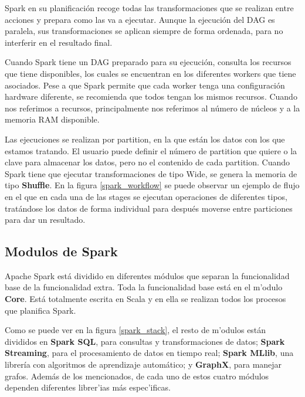 Spark en su planificación recoge todas las transformaciones que se realizan entre acciones y prepara como las va a ejecutar. Aunque la ejecución del DAG es paralela, sus transformaciones se aplican siempre de forma ordenada, para no interferir en el resultado final. 


Cuando Spark tiene un DAG preparado para su ejecución, consulta los recursos que tiene disponibles, los cuales se encuentran en los diferentes workers que tiene asociados. Pese a que Spark permite que cada worker tenga una configuración hardware diferente, se recomienda que todos tengan los mismos recursos. Cuando nos referimos a recursos, principalmente nos referimos al número de núcleos y a la memoria RAM disponible.


Las ejecuciones se realizan por partition, en la que están los datos con los que estamos tratando. El usuario puede definir el número de partition que quiere o la clave para almacenar los datos, pero no el contenido de cada partition. Cuando Spark tiene que ejecutar transformaciones de tipo Wide, se genera la memoria de tipo \textbf{Shuffle}. En la figura \ref{spark_workflow} se puede observar un ejemplo de flujo en el que en cada una de las stages se ejecutan operaciones de diferentes tipos, tratándose los datos de forma individual para después moverse entre particiones para dar un resultado.
















\clearpage
\subsection{Modulos de Spark}

Apache Spark está dividido en diferentes módulos que separan la funcionalidad base de la funcionalidad extra.
Toda la funcionalidad base está en el m'odulo \textbf{Core}. Está totalmente escrita en Scala y en ella se realizan todos los procesos que planifica Spark.



Como se puede ver en la figura \ref{spark_stack}, el resto de m'odulos están divididos en \textbf{Spark SQL}, para consultas y transformaciones de datos; \textbf{Spark Streaming}, para el procesamiento de datos en tiempo real; \textbf{Spark MLlib}, una librería con algoritmos de aprendizaje automático; y \textbf{GraphX}, para manejar grafos. Además de los mencionados, de cada uno de estos cuatro módulos dependen diferentes librer'ias más espec'ificas. 

